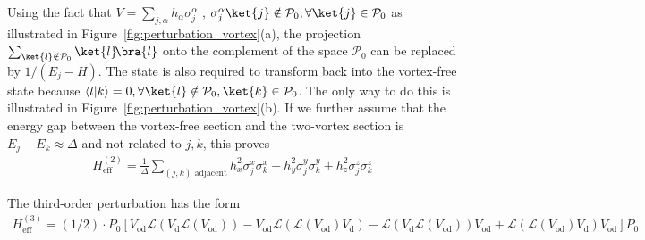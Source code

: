 Using the fact that $V = \sum_{j, \alpha} h_{\alpha}\sigma_j^{\alpha}$ , $\sigma_{j}^{\alpha}\ket{j} \notin \mathcal{P}_0, \forall \ket{j} \in \mathcal{P}_0$ as illustrated in Figure~\ref{fig:perturbation_vortex}(a), the projection $\sum_{\ket{l} \notin \mathcal{P}_0}\ket{l}\!\bra{l}$ onto the complement of the space $\mathcal{P}_0$ can be replaced by ${1}/{(E_j - H)}$. 
The state is also required to transform back into the vortex-free state because $\langle l | k\rangle =0 , \forall \ket{l}\notin \mathcal{P}_0, \ket{k} \in \mathcal{P}_0$. The only way to do this is illustrated in Figure~\ref{fig:perturbation_vortex}(b). If we further assume that the energy gap between the vortex-free section and the two-vortex section is  $E_j - E_k \approx \Delta $  and not related to $j,k$, this proves
\begin{align}
    H_{\mathrm{eff}}^{(2)} = \frac{1}{\Delta}\sum_{(j,k) \text{~adjacent}} h_x^2\sigma_j^x \sigma_k^x+h_y^2\sigma_j^y \sigma_k^y+h_z^2\sigma_j^z \sigma_k^z
\end{align}

The third-order perturbation has the form
\begin{align}
    H_{\mathrm{eff}}^{(3)} = (1/2)\cdot P_0 \left[V_{\mathrm{od}} \mathcal{L}(V_{\mathrm{d}}\mathcal{L}(V_{\mathrm{od}})) - V_{\mathrm{od}} \mathcal{L}(\mathcal{L}(V_{\mathrm{od}})V_{\mathrm{d}})-\mathcal{L}(V_{\mathrm{d}} \mathcal{L}(V_{\mathrm{od}}))V_{\mathrm{od}} + \mathcal{L}(\mathcal{L}(V_{\mathrm{od}})V_{\mathrm{d}})V_{\mathrm{od}}\right]P_0
\end{align}

